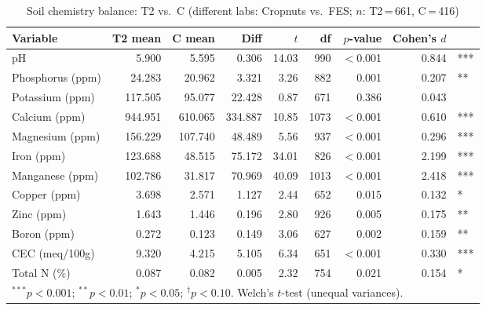 \documentclass[12pt]{article}
\begin{document}
\begin{table}[htbp]
\centering
\caption{Soil chemistry balance: T2 vs.\ C (different labs: Cropnuts vs.\ FES; $n$: T2\,=\,661, C\,=\,416)}
\label{tab:balance_t2_c}
\small
\begin{tabular}{lrrrrrrrl}
\toprule
Variable & T2 mean & C mean & Diff & $t$ & df & $p$-value & Cohen's $d$ & \\
\midrule
pH & 5.900 & 5.595 & 0.306 & 14.03 & 990 & $<$0.001 & 0.844 & *** \\
Phosphorus (ppm) & 24.283 & 20.962 & 3.321 & 3.26 & 882 & 0.001 & 0.207 & ** \\
Potassium (ppm) & 117.505 & 95.077 & 22.428 & 0.87 & 671 & 0.386 & 0.043 &  \\
Calcium (ppm) & 944.951 & 610.065 & 334.887 & 10.85 & 1073 & $<$0.001 & 0.610 & *** \\
Magnesium (ppm) & 156.229 & 107.740 & 48.489 & 5.56 & 937 & $<$0.001 & 0.296 & *** \\
Iron (ppm) & 123.688 & 48.515 & 75.172 & 34.01 & 826 & $<$0.001 & 2.199 & *** \\
Manganese (ppm) & 102.786 & 31.817 & 70.969 & 40.09 & 1013 & $<$0.001 & 2.418 & *** \\
Copper (ppm) & 3.698 & 2.571 & 1.127 & 2.44 & 652 & 0.015 & 0.132 & * \\
Zinc (ppm) & 1.643 & 1.446 & 0.196 & 2.80 & 926 & 0.005 & 0.175 & ** \\
Boron (ppm) & 0.272 & 0.123 & 0.149 & 3.06 & 627 & 0.002 & 0.159 & ** \\
CEC (meq/100g) & 9.320 & 4.215 & 5.105 & 6.34 & 651 & $<$0.001 & 0.330 & *** \\
Total N (\%) & 0.087 & 0.082 & 0.005 & 2.32 & 754 & 0.021 & 0.154 & * \\
\bottomrule
\multicolumn{9}{l}{\footnotesize $^{***}p<0.001$; $^{**}p<0.01$; $^{*}p<0.05$; $^{\dag}p<0.10$. Welch's $t$-test (unequal variances).} \\
\end{tabular}
\end{table}
\end{document}

